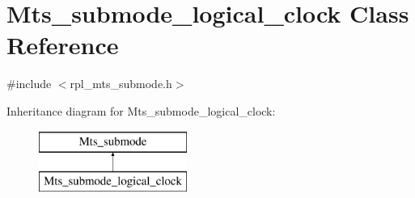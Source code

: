 \hypertarget{classMts__submode__logical__clock}{}\section{Mts\+\_\+submode\+\_\+logical\+\_\+clock Class Reference}
\label{classMts__submode__logical__clock}


{\ttfamily \#include $<$rpl\+\_\+mts\+\_\+submode.\+h$>$}

Inheritance diagram for Mts\+\_\+submode\+\_\+logical\+\_\+clock\+:\begin{figure}[H]
\begin{center}
\leavevmode
\includegraphics[height=2.000000cm]{classMts__submode__logical__clock}
\end{center}
\end{figure}
